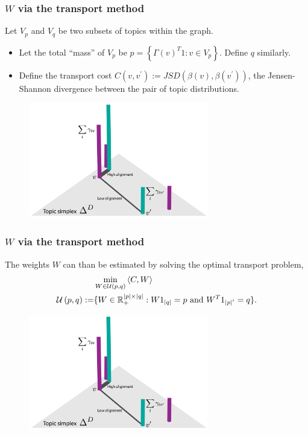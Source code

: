 \documentclass{beamer}
\begin{document}
\begin{frame}
  \frametitle{$W$ via the transport method}
  Let $V_p$ and $V_q$ be two subsets of topics within the graph.
  \begin{itemize}
    \item Let the total ``mass'' of $V_p$ be $p =
    \left\{\Gamma\left(v\right)^T 1 : v \in V_{p}\right\}$. Define $q$ similarly.
    \item Define the transport cost $C\left(v, v^\prime\right) :=
    JSD\left(\beta\left(v\right), \beta\left(v^\prime\right)\right)$, the
    Jensen-Shannon divergence between the pair of topic distributions.
  \end{itemize}
\begin{figure}
\includegraphics[width=0.7\textwidth]{transport_alignment}
\end{figure}
\end{frame}

\begin{frame}
\frametitle{$W$ via the transport method}
The weights $W$ can than be estimated by solving the optimal transport problem,
\begin{align*}
&\min_{W \in \mathcal{U}\left(p, q\right)} \left<C,W\right> \\
\mathcal{U}\left(p, q\right) := &\{W\in \mathbb{R}^{\left|p\right| \times \left|q\right|}_{+} : W 1_{\left|q\right|} = p \text{ and } W^{T} 1_{\left|p\right|^\prime} = q\}.
\end{align*}
\begin{figure}
\includegraphics[width=0.7\textwidth]{transport_alignment}
\end{figure}
\end{frame}
\end{document}

